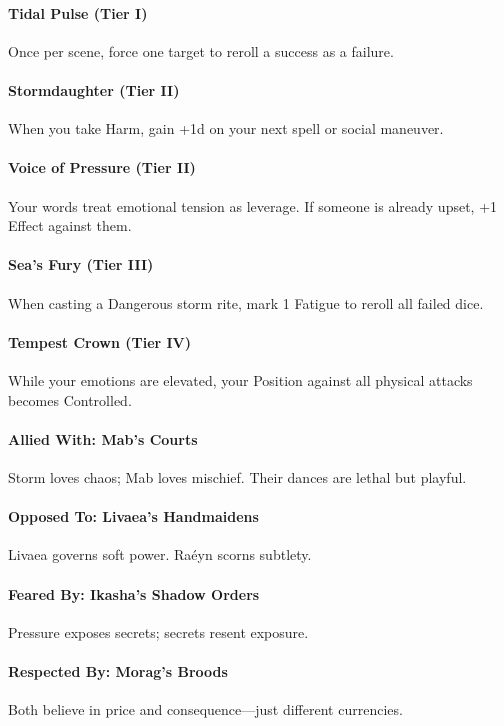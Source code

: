 \documentclass[11pt]{book}
\begin{document}
\paragraph{Tidal Pulse (Tier I)}
Once per scene, force one target to reroll a success as a failure.

\paragraph{Stormdaughter (Tier II)}
When you take Harm, gain +1d on your next spell or social maneuver.

\paragraph{Voice of Pressure (Tier II)}
Your words treat emotional tension as leverage.  
If someone is already upset, +1 Effect against them.

\paragraph{Sea's Fury (Tier III)}
When casting a Dangerous storm rite, mark 1 Fatigue to reroll all failed dice.

\paragraph{Tempest Crown (Tier IV)}
While your emotions are elevated, your Position against all physical attacks becomes Controlled.

\paragraph{Allied With: Mab's Courts}
Storm loves chaos; Mab loves mischief.  
Their dances are lethal but playful.

\paragraph{Opposed To: Livaea's Handmaidens}
Livaea governs soft power.  
Raéyn scorns subtlety.

\paragraph{Feared By: Ikasha's Shadow Orders}
Pressure exposes secrets; secrets resent exposure.

\paragraph{Respected By: Morag's Broods}
Both believe in price and consequence---just different currencies.
\end{document}

